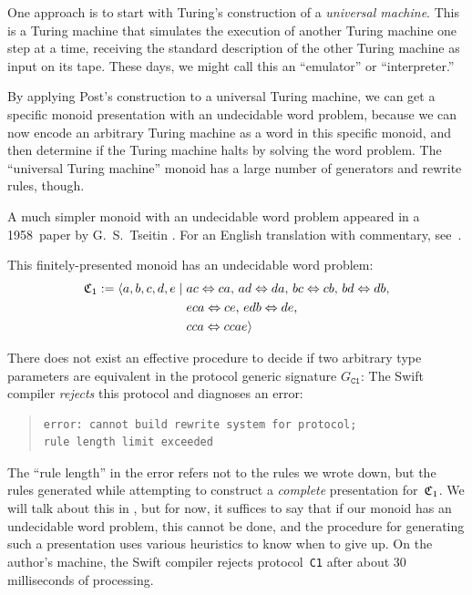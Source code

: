 \documentclass[../generics]{subfiles}
\begin{document}
One approach is to start with Turing's construction of a \emph{universal machine}. This is a Turing machine that simulates the execution of another Turing machine one step at a time, receiving the standard description of the other Turing machine as input on its tape. These days, we might call this an ``emulator'' or ``interpreter.''

By applying Post's construction to a universal Turing machine, we can get a specific monoid presentation with an undecidable word problem, because we can now encode an arbitrary Turing machine as a word in this specific monoid, and then determine if the Turing machine halts by solving the word problem. The ``universal Turing machine'' monoid has a large number of generators and rewrite rules, though.

A much simpler monoid with an undecidable word problem appeared in a 1958~paper by G.~S.~Tseitin \cite{undecidablesemigroup}. For an English translation with commentary, see~\cite{nybergbrodda2024g}.

\begin{theorem}\label{thm:undecidable monoid}
This finitely-presented monoid has an undecidable word problem:
\begin{align*}
\mathfrak{C}_1 := \langle a,b,c,d,e \mid {}&ac\Leftrightarrow ca,\,ad\Leftrightarrow da,\,bc\Leftrightarrow cb,\,bd\Leftrightarrow db,\\
&eca\Leftrightarrow ce,\,edb\Leftrightarrow de,\\
&cca\Leftrightarrow ccae\rangle
\end{align*}
\end{theorem}
\begin{example}\label{ex:undecidable monoid}
There does not exist an effective procedure to decide if two arbitrary type parameters are equivalent in the protocol generic signature $G_\texttt{C1}$:
The Swift compiler \emph{rejects} this protocol and diagnoses an error:
\begin{quote}
\begin{verbatim}
error: cannot build rewrite system for protocol;
rule length limit exceeded
\end{verbatim}
\end{quote}
The ``rule length'' in the error refers not to the rules we wrote down, but the rules generated while attempting to construct a \emph{complete} presentation for~$\mathfrak{C}_1$. We will talk about this in , but for now, it suffices to say that if our monoid has an undecidable word problem, this cannot be done, and the procedure for generating such a presentation uses various heuristics to know when to give up. On the author's machine, the Swift compiler rejects protocol~\texttt{C1} after about 30 milliseconds of processing.
\end{example}
\end{document}
